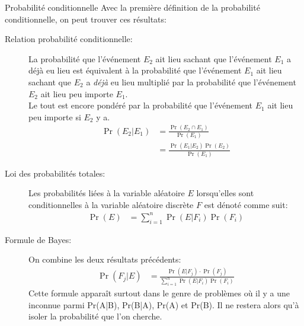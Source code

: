 \documentclass[10pt, french]{article}
\begin{document}
\begin{multicols*}{3}
\begin{probch3}{Probabilité conditionnelle}
Avec la première définition de la probabilité conditionnelle, on peut trouver ces résultats:
\begin{description}
	\item[Relation probabilité conditionnelle: ]	La probabilité que l'événement $E_{2}$ ait lieu sachant que l'événement $E_{1}$ a déjà eu lieu est équivalent à la probabilité que l'événement $E_{1}$ ait lieu sachant que $E_{2}$ a \textit{déjà} eu lieu multiplié par la probabilité que l'événement $E_{2}$ ait lieu peu importe $E_{1}$. \\
	Le tout est encore pondéré par la probabilité que l'événement $E_{1}$ ait lieu peu importe si $E_{2}$ y a.
	\begin{align*}
		\Pr(E_{2} | E_{1})
		&= 	\frac{\Pr(E_{2} \cap E_{1})}{\Pr(E_{1})}		\\
		&=	\frac{\Pr(E_{1} | E_{2}) \Pr(E_{2})}{\Pr(E_{1})}		
	\end{align*}
	\item[Loi des probabilités totales: ]	Les probabilités liées à la variable aléatoire $E$ lorsqu'elles sont conditionnelles à la variable aléatoire discrète $F$ est dénoté comme suit:
	\begin{align*}
		\Pr(E)	&=	\sum_{i = 1}^{n} \Pr(E | F_{i}) \Pr(F_{i})
	\end{align*}
	\item[Formule de Bayes: ]	On combine les deux résultats précédents:
	\begin{align*}
		\Pr(F_{j} | E) 
		&=	\frac{\Pr(E | F_{j}) \cdot \Pr(F_{j})}{\sum_{i = 1}^{n} \Pr(E | F_{i}) \Pr(F_{i})}
	\end{align*}
	Cette formule apparaît surtout dans le genre de problèmes où il y a une inconnue parmi Pr(A|B), Pr(B|A), Pr(A) et Pr(B). Il ne restera alors qu'à isoler la probabilité que l'on cherche.
\end{description}
\end{probch3}



\pagebreak

\end{multicols*}
\end{document}
